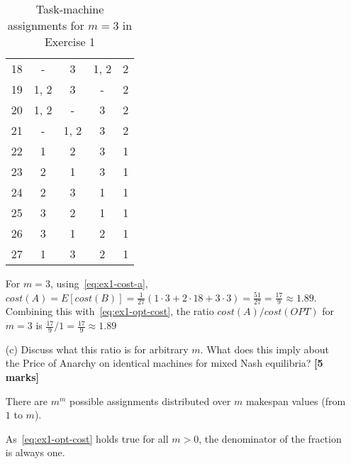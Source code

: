 \begin{enumerate}
\begin{table}[ht!]
\begin{tabular}{ccccc}
        18 & -       & 3       & 1, 2    & 2        \\
        19 & 1, 2    & 3       & -       & 2        \\
        20 & 1, 2    & -       & 3       & 2        \\
        21 & -       & 1, 2    & 3       & 2        \\
        22 & 1       & 2       & 3       & 1        \\
        23 & 2       & 1       & 3       & 1        \\
        24 & 2       & 3       & 1       & 1        \\
        25 & 3       & 2       & 1       & 1        \\
        26 & 3       & 1       & 2       & 1        \\
        27 & 1       & 3       & 2       & 1
        \end{tabular}
        \caption{Task-machine assignments for $m = 3$ in Exercise 1}
        \label{tab:ex1b}
    \end{table}

    For $m = 3$, using~\eqref{eq:ex1-cost-a}, $cost(A) = E[cost(B)] = \frac{1}{27} (1 \cdot 3 + 2 \cdot 18 + 3 \cdot 3) = \frac{51}{27} = \frac{17}{9} \approx 1.89$.
    Combining this with~\eqref{eq:ex1-opt-cost}, the ratio $cost(A)/cost(OPT)$ for $m = 3$ is $\frac{17}{9} / 1 = \frac{17}{9} \approx 1.89$

    \item[(c)] Discuss what this ratio is for arbitrary $m$. What does this imply about the Price of Anarchy on identical machines for mixed Nash equilibria?  \hfill{\bf [5 marks]}\smallskip

    There are $m^m$ possible assignments distributed over $m$ makespan values (from $1$ to $m$).

    As~\eqref{eq:ex1-opt-cost} holds true for all $m > 0$, the denominator of the fraction is always one.

\end{enumerate}
\vspace*{0.8cm}
